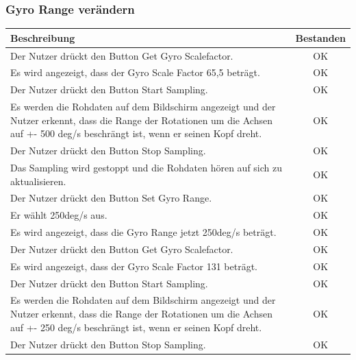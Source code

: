 \documentclass[a4paper,12pt]{article}
\newcommand{\testok}[0]{
	\cellcolor{green!25} OK
}
\begin{document}
\subsubsection{Gyro Range verändern}
\begin{tabular}{ | p{12cm} | c| }
	\hline
	\textbf{Beschreibung} & \textbf{Bestanden}\\
	\hline
	Der Nutzer drückt den Button \glqq{}Get Gyro Scalefactor\grqq{}. & \testok \\
	\hline
	Es wird angezeigt, dass der Gyro Scale Factor 65,5 beträgt. & \testok \\
	\hline
	Der Nutzer drückt den Button \glqq{}Start Sampling\grqq{}. & \testok \\
	\hline
	Es werden die Rohdaten auf dem Bildschirm angezeigt und der Nutzer erkennt, dass die Range der Rotationen um die Achsen auf +- 500 deg/s beschrängt ist, wenn er seinen Kopf dreht. & \testok \\
	\hline
	Der Nutzer drückt den Button \glqq{}Stop Sampling\grqq{}. & \testok \\
	\hline
	Das Sampling wird gestoppt und die Rohdaten hören auf sich zu aktualisieren. & \testok \\
	\hline
	Der Nutzer drückt den Button \glqq{}Set Gyro Range\grqq{}. & \testok \\
	\hline
	Er wählt 250deg/s aus. & \testok \\
	\hline
	Es wird angezeigt, dass die Gyro Range jetzt 250deg/s beträgt. & \testok \\
	\hline
	Der Nutzer drückt den Button \glqq{}Get Gyro Scalefactor\grqq{}. & \testok \\
	\hline
	Es wird angezeigt, dass der Gyro Scale Factor 131 beträgt. & \testok \\
	\hline
	Der Nutzer drückt den Button \glqq{}Start Sampling\grqq{}. & \testok \\
	\hline
	Es werden die Rohdaten auf dem Bildschirm angezeigt und der Nutzer erkennt, dass die Range der Rotationen um die Achsen auf +- 250 deg/s beschrängt ist, wenn er seinen Kopf dreht. & \testok \\
	\hline
	Der Nutzer drückt den Button \glqq{}Stop Sampling\grqq{}. & \testok \\
	\hline
\end{tabular}
\\ \\ \\ \\
\end{document}
